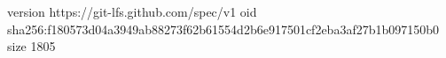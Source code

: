 version https://git-lfs.github.com/spec/v1
oid sha256:f180573d04a3949ab88273f62b61554d2b6e917501cf2eba3af27b1b097150b0
size 1805
